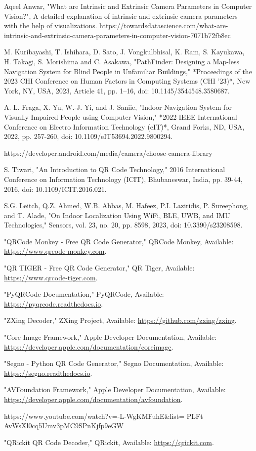 \begin{thebibliography}{9}
	Aqeel Anwar, "What are Intrinsic and Extrinsic Camera Parameters in Computer Vision?", A detailed explanation of intrinsic and extrinsic camera parameters with the help of visualizations.
	https://towardsdatascience.com/what-are-intrinsic-and-extrinsic-camera-parameters-in-computer-vision-7071b72fb8ec
	
	M. Kuribayashi, T. Ishihara, D. Sato, J. Vongkulbhisal, K. Ram, S. Kayukawa, H. Takagi, S. Morishima and C. Asakawa, "PathFinder: Designing a Map-less Navigation System for Blind People in Unfamiliar Buildings," *Proceedings of the 2023 CHI Conference on Human Factors in Computing Systems (CHI '23)*, New York, NY, USA, 2023, Article 41, pp. 1–16, doi: 10.1145/3544548.3580687.
	
	A. L. Fraga, X. Yu, W.-J. Yi, and J. Saniie, "Indoor Navigation System for Visually Impaired People using Computer Vision," *2022 IEEE International Conference on Electro Information Technology (eIT)*, Grand Forks, ND, USA, 2022, pp. 257-260, doi: 10.1109/eIT53694.2022.9800294.
	
	https://developer.android.com/media/camera/choose-camera-library
	
	S. Tiwari, "An Introduction to QR Code Technology," 2016 International Conference on Information Technology (ICIT), Bhubaneswar, India, pp. 39-44, 2016, doi: 10.1109/ICIT.2016.021.
	
	 S.G. Leitch, Q.Z. Ahmed, W.B. Abbas, M. Hafeez, P.I. Laziridis, P. Sureephong, and T. Alade, "On Indoor Localization Using WiFi, BLE, UWB, and IMU Technologies," Sensors, vol. 23, no. 20, pp. 8598, 2023, doi: 10.3390/s23208598.
	
	 "QRCode Monkey - Free QR Code Generator," QRCode Monkey, Available: \url{https://www.qrcode-monkey.com}.
	
	 "QR TIGER - Free QR Code Generator," QR Tiger, Available: \url{https://www.qrcode-tiger.com}.
	
	
	 "PyQRCode Documentation," PyQRCode, Available: \url{https://pyqrcode.readthedocs.io}.

	 "ZXing Decoder," ZXing Project, Available: \url{https://github.com/zxing/zxing}.

	 "Core Image Framework," Apple Developer Documentation, Available: \url{https://developer.apple.com/documentation/coreimage}.

	 "Segno - Python QR Code Generator," Segno Documentation, Available: \url{https://segno.readthedocs.io}.

	 "AVFoundation Framework," Apple Developer Documentation, Available: \url{https://developer.apple.com/documentation/avfoundation}.

	https://www.youtube.com/watch?v=-L-WgKMFuhE\&list=
	PLFt AvWsXl0cq5Umv3pMC9SPnKjfp9eGW

	 "QRickit QR Code Decoder," QRickit, Available: \url{https://qrickit.com}.
\end{thebibliography}